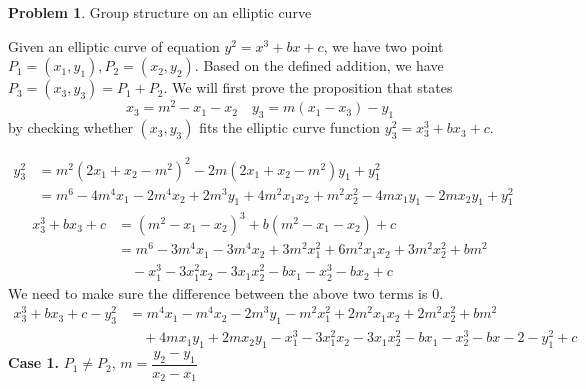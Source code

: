 \documentclass[12pt]{article}
\theoremstyle{definition}
\newtheorem{problem}{Problem}
\begin{document}
\begin{problem}
Group structure on an elliptic curve
\end{problem}
Given an elliptic curve of equation $y^2=x^3+bx+c$, we have two point $P_1=(x_1,y_1),P_2=(x_2,y_2)$.
Based on the defined addition, we have $P_3 = (x_3,y_3) = P_1+P_2$. We will first prove the proposition that states 
$$x_3=m^2-x_1-x_2 \quad y_3 = m(x_1-x_3)-y_1$$
by checking whether $(x_3,y_3)$ fits the elliptic curve function $y_3^2=x_3^3+bx_3+c$.

\begin{align*}
y_3^2&=m^2(2x_1+x_2-m^2)^2-2m(2x_1+x_2-m^2)y_1+y_1^2\\
&=m^6-4m^4x_1-2m^4x_2+2m^3y_1+4m^2x_1x_2+m^2x_2^2-4mx_1y_1-2mx_2y_1
+y_1^2
\end{align*}
\begin{align*}
x_3^3+bx_3+c&=(m^2-x_1-x_2)^3+b(m^2-x_1-x_2)+c\\
&=m^6-3m^4x_1-3m^4x_2+3m^2x_1^2+6m^2x_1x_2+3m^2x_2^2+bm^2\\
&\quad-x_1^3-3x_1^2x_2-3x_1x_2^2-bx_1-x_2^3-bx_2+c
\end{align*}
We need to make sure the difference between the above two terms is 0.
\begin{align*}
x_3^3+bx_3+c-y_3^2&=m^4x_1-m^4x_2-2m^3y_1-m^2x_1^2+2m^2x_1x_2+2m^2x_2^2+bm^2\\
&\quad+4mx_1y_1+2mx_2y_1-x_1^3-3x_1^2x_2-3x_1x_2^2-bx_1-x_2^3-bx-2-y_1^2+c
\end{align*}
\textbf{Case 1.} $P_1\neq P_2$, $m=\dfrac{y_2-y_1}{x_2-x_1}$
    
\end{document}
